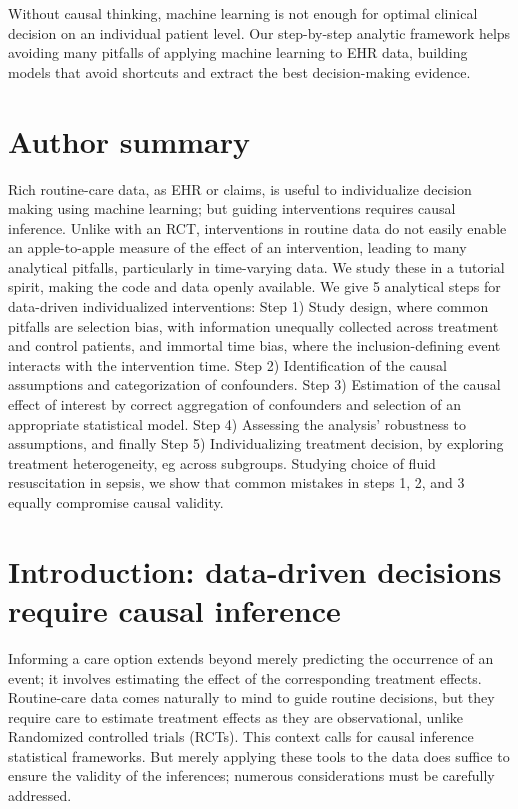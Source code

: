 \documentclass[10pt,letterpaper]{article}
\begin{document}
Without causal thinking, machine learning is not enough for optimal clinical
decision on an individual patient level. Our step-by-step analytic framework helps avoiding many pitfalls of applying machine learning to EHR data,
building models that avoid shortcuts and extract the best decision-making evidence.

\section*{Author summary}

Rich routine-care data, as EHR or claims, is useful to individualize decision
making using machine learning; but guiding interventions requires
causal inference. Unlike with an RCT, interventions in routine data do
not easily enable an apple-to-apple measure of the effect of an
intervention, leading to many analytical pitfalls, particularly in
time-varying data. We study these in a tutorial spirit, making
the code and data openly available. We give 5 analytical steps for
data-driven individualized interventions: Step
1) Study design, where common pitfalls are selection bias, with information
unequally collected across treatment and control patients, and immortal time
bias, where the inclusion-defining event interacts with the
intervention time. Step 2) Identification of the causal assumptions and
categorization of confounders. Step 3) Estimation of the causal effect of
interest by correct aggregation of confounders and selection of an appropriate
statistical model. Step 4) Assessing the
analysis' robustness to assumptions, and finally Step 5) Individualizing
treatment decision, by exploring treatment heterogeneity, eg across subgroups.
Studying choice of fluid resuscitation in sepsis, we show that common
mistakes in steps 1, 2, and 3 equally compromise causal validity.


\linenumbers

\section*{Introduction: data-driven decisions require causal inference}

Informing a care option extends beyond merely predicting the occurrence
of an event; it involves estimating the effect of the corresponding
treatment effects. Routine-care data comes naturally to mind to guide
routine decisions, but they require care to estimate treatment effects as
they are observational, unlike Randomized controlled trials (RCTs). This
context calls for causal inference statistical frameworks.
But merely applying these tools to the data does suffice to ensure the
validity of the inferences; numerous considerations must be carefully addressed.
\end{document}
